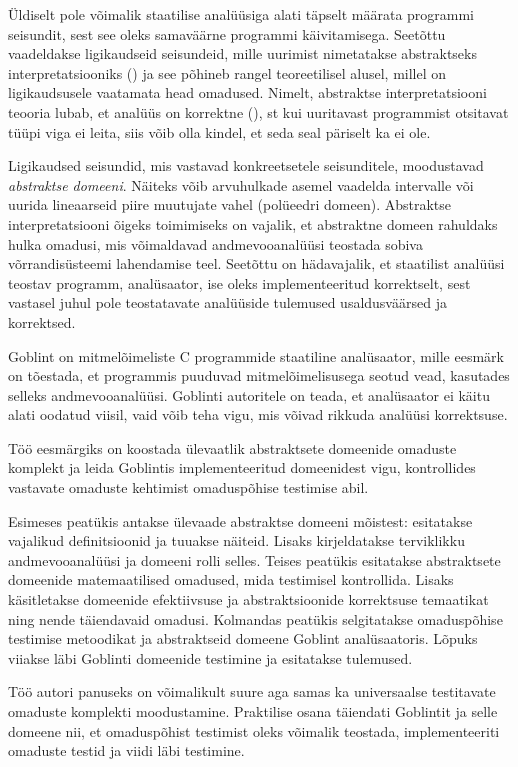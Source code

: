 \documentclass[../thesis.tex]{subfiles}
\begin{document}
Üldiselt pole võimalik staatilise analüüsiga alati täpselt määrata programmi seisundit, sest see oleks samaväärne programmi käivitamisega. Seetõttu vaadeldakse ligikaudseid seisundeid, mille uurimist nimetatakse abstraktseks interpretatsiooniks () ja see põhineb rangel teoreetilisel alusel, millel on ligikaudsusele vaatamata head omadused. Nimelt, abstraktse interpretatsiooni teooria lubab, et analüüs on korrektne (), st kui uuritavast programmist otsitavat tüüpi viga ei leita, siis võib olla kindel, et seda seal päriselt ka ei ole.

Ligikaudsed seisundid, mis vastavad konkreetsetele seisunditele, moodustavad \emph{abstraktse domeeni}. Näiteks võib arvuhulkade asemel vaadelda intervalle või uurida lineaarseid piire muutujate vahel (polüeedri domeen). Abstraktse interpretatsiooni õigeks toimimiseks on vajalik, et abstraktne domeen rahuldaks hulka omadusi, mis võimaldavad andmevooanalüüsi teostada sobiva võrrandisüsteemi lahendamise teel. Seetõttu on hädavajalik, et staatilist analüüsi teostav programm, analüsaator, ise oleks implementeeritud korrektselt, sest vastasel juhul pole teostatavate analüüside tulemused usaldusväärsed ja korrektsed.

Goblint on mitmelõimeliste C programmide staatiline analüsaator, mille eesmärk on tõestada, et programmis puuduvad mitmelõimelisusega seotud vead, kasutades selleks andmevooanalüüsi. Goblinti autoritele on teada, et analüsaator ei käitu alati oodatud viisil, vaid võib teha vigu, mis võivad rikkuda analüüsi korrektsuse.

Töö eesmärgiks on koostada ülevaatlik abstraktsete domeenide omaduste komplekt ja leida Goblintis implementeeritud domeenidest vigu, kontrollides vastavate omaduste kehtimist omaduspõhise testimise abil.

Esimeses peatükis antakse ülevaade abstraktse domeeni mõistest: esitatakse vajalikud definitsioonid ja tuuakse näiteid. Lisaks kirjeldatakse terviklikku andmevooanalüüsi ja domeeni rolli selles.
Teises peatükis esitatakse abstraktsete domeenide matemaatilised omadused, mida testimisel kontrollida. Lisaks käsitletakse domeenide efektiivsuse ja abstraktsioonide korrektsuse temaatikat ning nende täiendavaid omadusi.
Kolmandas peatükis selgitatakse omaduspõhise testimise metoodikat ja abstraktseid domeene Goblint analüsaatoris. Lõpuks viiakse läbi Goblinti domeenide testimine ja esitatakse tulemused.

Töö autori panuseks on võimalikult suure aga samas ka universaalse testitavate omaduste komplekti moodustamine. Praktilise osana täiendati Goblintit ja selle domeene nii, et omaduspõhist testimist oleks võimalik teostada, implementeeriti omaduste testid ja viidi läbi testimine.
\end{document}
